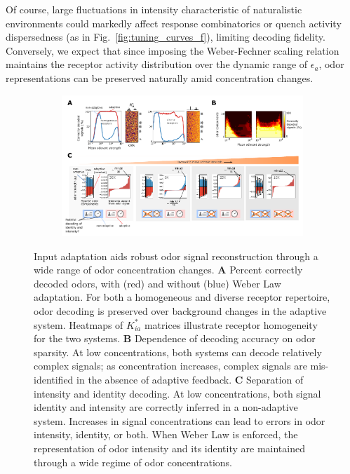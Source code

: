Of course, large fluctuations in intensity characteristic of naturalistic environments could markedly affect response combinatorics or quench activity dispersedness (as in Fig.~\ref{fig:tuning_curves_f}), limiting decoding fidelity. Conversely, we expect that since imposing the Weber-Fechner scaling relation maintains the receptor activity distribution over the dynamic range of $\epsilon_a$, odor representations can be preserved naturally amid concentration changes.







\begin{figure}[!tb]
	\centering
	\begin{subfigure}[t]{\linewidth}
		\includegraphics[width=\textwidth]{figures/Figures_signal_decoding_weber_law}
		\phantomsubcaption
		\label{fig:decoding_a}
	\end{subfigure}
	\begin{subfigure}[t]{0\linewidth}
		\label{fig:decoding_b}
	\end{subfigure}
	\begin{subfigure}[t]{0\linewidth}
		\label{fig:decoding_c}
	\end{subfigure}
	\caption{\footnotesize{Input adaptation aids robust odor signal reconstruction through a wide range of odor concentration changes. \textbf{A} Percent correctly decoded odors, with (red) and without (blue) Weber Law adaptation. For both a homogeneous and diverse receptor repertoire, odor decoding is preserved over background changes in the adaptive system. Heatmaps of $K^*_{ia}$ matrices illustrate receptor homogeneity for the two systems. \textbf{B} Dependence of decoding accuracy on odor sparsity. At low concentrations, both systems can decode relatively complex signals; as concentration increases, complex signals are mis-identified in the absence of adaptive feedback. \textbf{C} Separation of intensity and identity decoding. At low concentrations, both signal identity and intensity are correctly inferred in a non-adaptive system. Increases in signal concentrations can lead to errors in odor intensity, identity, or both. When Weber Law is enforced, the representation of odor intensity and its identity are maintained through a wide regime of odor concentrations.}}

\end{figure}
